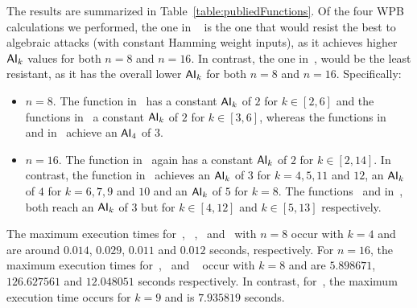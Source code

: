 \documentclass[11pt]{llncs}
\begin{document}
The results are summarized in Table~\ref{table:publiedFunctions}. 
Of the four WPB calculations we performed, the one in ~\cite{CC:TangLiu19} is the one that would resist the best to algebraic attacks (with constant Hamming weight inputs), as it achieves higher $\mathsf{AI}_{k}$ values for both $n = 8$ and $ n = 16$. In contrast, the one in~\cite{Mat:ZJZQ23}, would be the least resistant, as it has the overall lower $\mathsf{AI}_{k}$ for both $n=8$ and $n=16$. Specifically:
\begin{itemize}
\item $n=8$. 
The function in~\cite{Mat:ZJZQ23} has a constant $\mathsf{AI}_{k}$ of $2$ for $k \in [2, 6]$ and the functions in~\cite{TOSC:CarMeaRot17} a constant $\mathsf{AI}_{k}$ of $2$ for $k \in [3, 6]$, whereas the functions in~\cite{AMC:DalMal23} and in~\cite{CC:TangLiu19} achieve an $\mathsf{AI}_{4}$ of $3$.

\item $n=16$. 
The function in~\cite{Mat:ZJZQ23} again has a constant $\mathsf{AI}_{k}$ of $2$ for $k \in [2, 14]$. 
In contrast, the function in~\cite{CC:TangLiu19} achieves an $\mathsf{AI}_{k}$ of $3$ for $k = 4,5,11$ and $12$, an $\mathsf{AI}_{k}$ of $4$ for $k = 6,7,9$ and $10$ and an $\mathsf{AI}_{k}$ of $5$ for $k=8$. The functions~\cite{AMC:DalMal23} and in~\cite{TOSC:CarMeaRot17}, both reach an $\mathsf{AI}_{k}$ of $3$ but for $k\in [4,12]$ and $k\in [5,13]$ respectively.
\end{itemize}


The maximum execution times for~\cite{AMC:DalMal23}, ~\cite{Mat:ZJZQ23},~\cite{CC:TangLiu19} and~\cite{TOSC:CarMeaRot17} with $n=8$ occur with $k=4$ and are around $0.014$, $0.029$, $0.011$ and $0.012$ seconds, respectively.
For $n=16$, the maximum execution times for~\cite{Mat:ZJZQ23},~\cite{CC:TangLiu19} and ~\cite{TOSC:CarMeaRot17} occur with $k=8$ and are $5.898671$, $126.627561$ and $12.048051$ seconds respectively. In contrast, for~\cite{AMC:DalMal23}, the maximum execution time occurs for $k=9$ and is $7.935819$ seconds.
\end{document}
